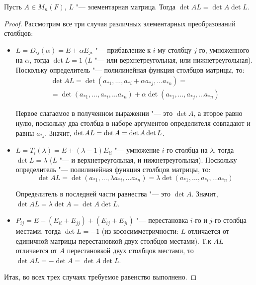 \begin{proposition}
	Пусть $A \in M_n(F)$, $L$ "--- элементарная матрица. Тогда $\det{AL} = \det{A}\det{L}$.
\end{proposition}

\begin{proof}
	Рассмотрим все три случая различных элементарных преобразований столбцов:
	\begin{itemize}
		\item $L = D_{ij}(\alpha) = E + \alpha E_{ji}$ "--- прибавление к $i$-му столбцу $j$-го, умноженного на $\alpha$, тогда $\det{L} = 1$ ($L$ "--- или верхнетреугольная, или нижнетреугольная). Поскольку определитель "--- полилинейная функция столбцов матрицы, то:
		\begin{multline*}
			\det{AL} = \det{(a_{*1}, \dots,a_{*i} + \alpha a_{*j},\dots a_{*n})} =\\
			=\det{(a_{*1},\dots,a_{*i},\dots a_{*n})} + \alpha\det{(a_{*1},\dots,a_{*j},\dots a_{*n})}
		\end{multline*}
				
		Первое слагаемое в полученном выражении "--- это $\det{A}$, а второе равно нулю, поскольку два столбца в наборе аргументов определителя совпадают и равны $a_{*j}$. Значит, $\det{AL} = \det{A} \hm{=} \det{A}\det{L}$.
		
		\item $L = T_{i}(\lambda) = E + (\lambda - 1) E_{ii}$ "--- умножение $i$-го столбца на $\lambda$, тогда $\det{L} = \lambda$ ($L$ "--- и верхнетреугольная, и нижнетреугольная). Поскольку определитель "--- полилинейная функция столбцов матрицы, то:
		\[\det{AL} = \det{(a_{*1}, \dots,\lambda a_{*i},\dots a_{*n})} =\lambda\det{(a_{*1},\dots,a_{*i},\dots a_{*n})}\]
		
		Определитель в последней части равнества "--- это $\det{A}$. Значит, $\det{AL} = \lambda\det{A} = \det{A}\det{L}$.
		
		\item $P_{ij} = E - (E_{ii} + E_{jj}) + (E_{ij} + E_{ji})$ "--- перестановка $i$-го и $j$-го столбца местами, тогда $\det{L} = -1$ (из кососимметричности: $L$ отличается от единичной матрицы перестановкой двух столбцов местами). Т.\:к $AL$ отличается от $A$ перестановкой двух столбцов местами, то $\det{AL} = -\det{A} = \det{A}\det{L}$.
	\end{itemize}

	Итак, во всех трех случаях требуемое равенство выполнено.
\end{proof}

